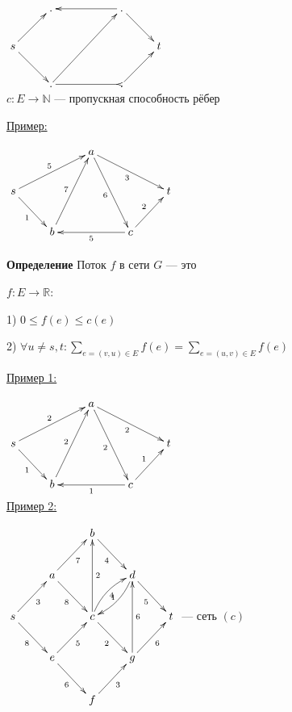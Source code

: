 \documentclass[a4paper, 12pt] {article}
\begin{document}
 $ \begin{matrix}
 	\xymatrix{
 		& . \ar@{<-}[rr] \ar@{<-}[ld] & & . \ar@{->}[rd] \\
 		s \ar@{->}[rd] & & & & t \ar@{<-}[ld] \\
 		& . \ar@{-<}[rr] \ar@{->}[rruu] & & .  \\
 	}
 \end{matrix} $\\

$ c: E \rightarrow \mathbb N$ --- пропускная способность рёбер

\underline{Пример:}

$\begin{matrix}
	\xymatrix{
		& & a \ar@{->}[rdr]_3 \ar@{->}[rdd]_6 \ar@{<-}[ldd]_7 \ar@{<-}[lld]_5 \\
		s \ar@{->}[rd]_1 & & & & t \ar@{<-}[ld]_2 \\
		& b \ar@{<-}[rr]_5 &  & c  \\
	}
\end{matrix}$

\textbf{Определение} Поток $ f $ в сети $ G $ --- это 

$ f: E \rightarrow \mathbb R$:

1) $ 0 \le f(e) \le c(e) $

2) $ \forall u \ne s, t: \sum_{e =(v, u) \in E} f(e) = \sum_{e =(u, v) \in E} f(e) $
\newpage

\underline{Пример 1:}

$\begin{matrix}
	\xymatrix{
		& & a \ar@{->}[rdr]_2 \ar@{->}[rdd]_2 \ar@{<-}[ldd]_2 \ar@{<-}[lld]_2 \\
		s \ar@{->}[rd]_1 & & & & t \ar@{<-}[ld]_1 \\
		& b \ar@{<-}[rr]_1 &  & c  \\
	}
\end{matrix}$\\

\underline{Пример 2:}

$\begin{matrix}
	\xymatrix{
		& & b \ar@{->}[rd]_4 \\
	& a \ar@{->}[rd]_8 \ar@{->}[ru]_7 & & d \ar@{->}[rd]_5 \ar@/^/[dl]_4 \\
	s \ar@{->}[rd]_8 \ar@{->}[ru]_3 & & c \ar@{->}[uu]_2 \ar@{->}[rd]_2 \ar@/^/[ru]_1 & & t \\
	& e \ar@{->}[rd]_6 \ar@{->}[ru]_5 & & g \ar@{->}[ru]_6 \ar@{->}[uu]_6 \\
	& & f \ar@{->}[ru]_3
	}
\end{matrix}$ --- сеть $ (c) $ \\
\end{document}

